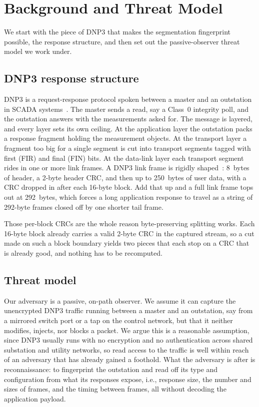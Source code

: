 \documentclass[conference]{IEEEtran}
\begin{document}
\section{Background and Threat Model}

We start with the piece of DNP3 that makes the segmentation fingerprint possible,
the response structure, and then set out the passive-observer threat model we
work under.

\subsection{DNP3 response structure}

DNP3 is a request-response protocol spoken between a master and an outstation in
SCADA systems~\cite{ref:dnp3}. The master sends a read, say a Class~0 integrity
poll, and the outstation answers with the measurements asked for. The message is
layered, and every layer sets its own ceiling. At the application layer the
outstation packs a response fragment holding the measurement objects. At the
transport layer a fragment too big for a single segment is cut into transport
segments tagged with first (FIR) and final (FIN) bits. At the data-link layer
each transport segment rides in one or more link frames. A DNP3 link frame is
rigidly shaped~\cite{ref:dnp3}: 8~bytes of header, a 2-byte header CRC, and then
up to 250~bytes of user data, with a CRC dropped in after each 16-byte block. Add
that up and a full link frame tops out at 292~bytes, which forces a long
application response to travel as a string of 292-byte frames closed off by one
shorter tail frame.

Those per-block CRCs are the whole reason byte-preserving splitting works. Each
16-byte block already carries a valid 2-byte CRC in the captured stream, so a cut
made on such a block boundary yields two pieces that each stop on a CRC that is
already good, and nothing has to be recomputed.

\subsection{Threat model}

Our adversary is a passive, on-path observer. We assume it can capture the
unencrypted DNP3 traffic running between a master and an outstation, say from a
mirrored switch port or a tap on the control network, but that it neither
modifies, injects, nor blocks a packet. We argue this is a reasonable assumption,
since DNP3 usually runs with no encryption and no authentication across shared
substation and utility networks, so read access to the traffic is well within
reach of an adversary that has already gained a foothold. What the adversary is
after is reconnaissance: to fingerprint the outstation and read off its type and
configuration from what its responses expose, i.e., response size, the number and
sizes of frames, and the timing between frames, all without decoding the
application payload.
\end{document}

